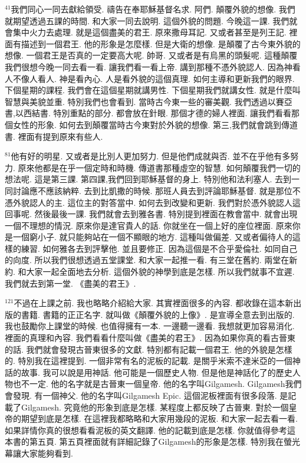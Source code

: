 \documentclass{book}
\begin{document}
$^{41}$我們同心一同去獻給領受.
禱告在奉耶穌基督名求.
阿們.
顛覆外貌的想像.
我們就期望透過五課的時間.
和大家一同去說明.
這個外貌的問題.
今晚這一課.
我們就會集中火力去處理.
就是這個盡美的君王.
原來撒母耳記.
又或者甚至是列王記.
裡面有描述到一個君王.
他的形象是怎麼樣.
但是大衛的想像.
是顛覆了古今東外貌的想像.
一個君王是否真的一定要高大呢.
帥哥.
又或者是有烏黑的頭髮呢.
這種顛覆我們很想今晚一同去看一看.
讓我們看一看上帝.
講到那種不憑外貌認人.
因為神看人不像人看人.
神是看內心.
人是看外貌的這個真理.
如何主導和更新我們的眼界.
下個星期的課程.
我們會在這個星期就講男性.
下個星期我們就講女性.
就是什麼叫智慧與美貌並重.
特別我們也會看到.
當時古今東一些的審美觀.
我們透過以賽亞書,以西結書.
特別重點的部分.
都會放在針眼.
那個才德的婦人裡面.
讓我們看看那個女性的形象.
如何去到顛覆當時古今東對於外貌的想像.
第三,我們就會跳到傳道書.
裡面有提到原來有些人.

$^{81}$他有好的明星.
又或者是比別人更加努力.
但是他們成就與否.
並不在乎他有多努力.
原來他都是在乎一個定時和時機.
傳道書那種虛空的智慧.
如何顛覆我們一切的想法呢.
這是第三課.
第四課,我們回到耶穌基督的身上.
特別他和法利塞人.
去到一同討論應不應該納粹.
去到比凱撒的時候.
那班人員去到評論耶穌基督.
就是那位不憑外貌認人的主.
這位主的對答當中.
如何去到改變和更新.
我們對於憑外貌認人這回事呢.
然後最後一課.
我們就會去到雅各書.
特別提到裡面在教會當中.
就會出現一個不理想的情況.
原來你是達官貴人的話.
你就坐在一個上好的座位裡面.
原來你是一個窮小子.
就只能夠站在一個不顯眼的地方.
這種叫做偏差.
又或者偏待人的這樣的練習.
如何雅各去到評擊他.
並且要修正.
因為這個是不合乎愛倫社.
如同自己的向度.
所以我們很想透過五堂課堂.
和大家一起推一看.
有三堂在舊約.
兩堂在新約.
和大家一起全面地去分析.
這個外貌的神學到底是怎樣.
所以我們就事不宜遲.
我們就去到第一堂.
《盡美的君王》.

$^{121}$不過在上課之前.
我也略略介紹給大家.
其實裡面很多的內容.
都收錄在這本新出版的書籍.
書籍的正正名字.
就叫做《顛覆外貌的上像》.
是宣導全意去到出版的.
我也鼓勵你上課堂的時候.
也值得擁有一本.
一邊聽一邊看.
我想就更加容易消化.
裡面的真理和內容.
我們看看什麼叫做《盡美的君王》.
因為如果你真的看古晉東的話.
我們就會發現古晉東很多的文獻.
特別都有記載一個君王.
他的外貌是怎樣的.
特別我在這裡提到.
一個非常有名的泥板的記載.
是關乎米索不達米亞的一個神話的故事.
我可以說是用神話.
他可能是一個歷史人物.
但是他是神話化了的歷史人物也不一定.
他的名字就是古晉東一個皇帝.
他的名字叫Gilgamesh.
Gilgamesh我們會發現.
有一個神父.
他的名字叫Gilgamesh Epic.
這個泥板裡面有很多段落.
是記載了Gilgamesh.
究竟他的形象到底是怎樣.
某程度上都反映了古晉東.
對於一個皇帝的期望到底是怎樣.
在這裡我都略略和大家用幾段的泥板.
和大家一起去看一看.
如果詳情你真的很想看看泥板的英文翻譯.
他的記載到底是怎樣.
你就值得參考這本書的第五頁.
第五頁裡面就有詳細記錄了Gilgamesh的形象是怎樣.
特別我在螢光幕讓大家能夠看到.
\end{document}
